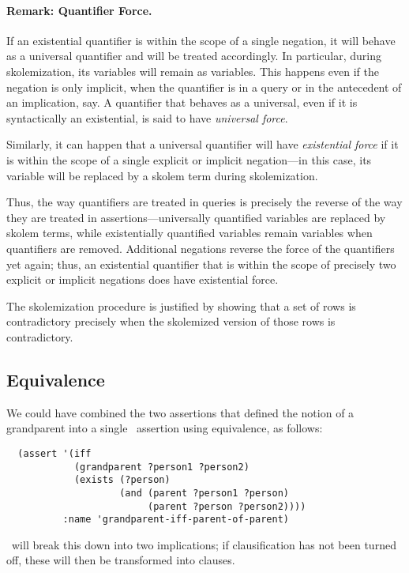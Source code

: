 \paragraph{Remark: Quantifier Force.}
\label{subsec-quantifier-force}
If an existential quantifier is within the scope of a single negation, it
will behave as a universal quantifier and will be treated accordingly.  In
particular, during skolemization, its variables will remain as variables.
This happens even if the negation is only implicit, when the quantifier is in
a query or in the antecedent of an implication, say.  A quantifier that
behaves as a universal, even if it is syntactically an existential, is said
to have {\em universal force}.

Similarly, it can happen that a universal quantifier will have {\em
existential force} if it is within the scope of a single explicit or
implicit negation---in this case, its variable will be replaced by a
skolem term during skolemization.

Thus, the way quantifiers are treated in queries is precisely the
reverse of the way they are treated in assertions---universally
quantified variables are replaced by skolem terms, while existentially
quantified variables remain variables when quantifiers are removed.
Additional negations reverse the force of the quantifiers yet again;  thus,
an existential quantifier that is within the scope of precisely two explicit
or implicit negations does have existential force.

The skolemization procedure is justified by showing that a set of rows
is contradictory precisely when the skolemized version of those rows
is contradictory.
\subsection{Equivalence}
\label{subsec-equivalence}
We could have combined the two assertions that
defined the notion of a grandparent into a single \snark\  assertion using
equivalence, as follows:
\begin{verbatim}
  (assert '(iff
            (grandparent ?person1 ?person2)
            (exists (?person)
                    (and (parent ?person1 ?person)
                         (parent ?person ?person2))))
          :name 'grandparent-iff-parent-of-parent)
\end{verbatim}
\Snark\  will break this down into two implications; if clausification
has not been turned off, these will then be transformed into clauses.


